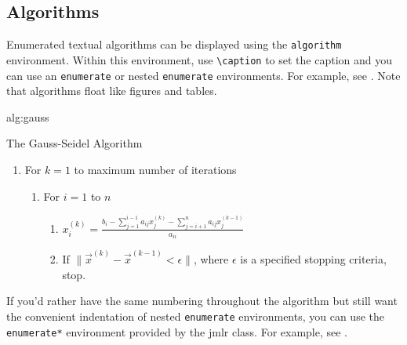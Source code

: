 \documentclass[pmlr,twocolumn,10pt]{jmlr} %
\begin{document}
\subsection{Algorithms}
\label{sec:algorithms}

Enumerated textual algorithms can be displayed using the
\texttt{algorithm} environment. Within this environment, use
\verb|\caption| to set the caption and you can use an
\texttt{enumerate} or nested \texttt{enumerate} environments.
For example, see . Note that algorithms
float like figures and tables.

\begin{algorithm}[htbp]
\floatconts
  {alg:gauss}%
  {\caption{The Gauss-Seidel Algorithm}}%
{%
\begin{enumerate}
  \item For $k=1$ to maximum number of iterations
    \begin{enumerate}
      \item For $i=1$ to $n$
        \begin{enumerate}
        \item $x_i^{(k)} = 
          \frac{b_i - \sum_{j=1}^{i-1}a_{ij}x_j^{(k)}
          - \sum_{j=i+1}^{n}a_{ij}x_j^{(k-1)}}{a_{ii}}$
        \item If $\|\vec{x}^{(k)}-\vec{x}^{(k-1)} < \epsilon\|$,
          where $\epsilon$ is a specified stopping criteria, stop.
      \end{enumerate}
    \end{enumerate}
\end{enumerate}
}%
\end{algorithm}

If you'd rather have the same numbering throughout the algorithm
but still want the convenient indentation of nested 
\texttt{enumerate} environments, you can use the
\texttt{enumerate*} environment provided by the \textsf{jmlr}
class. For example, see .
\end{document}
